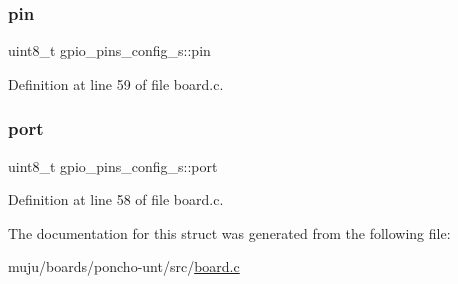 \subsubsection{\texorpdfstring{pin}{pin}}
{\footnotesize\ttfamily uint8\+\_\+t gpio\+\_\+pins\+\_\+config\+\_\+s\+::pin}



Definition at line 59 of file board.\+c.

\mbox{\label{structgpio__pins__config__s_a30e7e6f25a7dbb492bc4fd8d931b4469}} 
\subsubsection{\texorpdfstring{port}{port}}
{\footnotesize\ttfamily uint8\+\_\+t gpio\+\_\+pins\+\_\+config\+\_\+s\+::port}



Definition at line 58 of file board.\+c.



The documentation for this struct was generated from the following file\+:\begin{DoxyCompactItemize}
\item 
muju/boards/poncho-\/unt/src/\hyperlink{poncho-unt_2src_2board_8c}{board.\+c}\end{DoxyCompactItemize}
